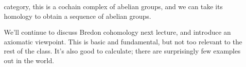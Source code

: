 category, this is a cochain complex of abelian groups, and we can take its homology to obtain a sequence of abelian
groups.

We'll continue to discuss Bredon cohomology next lecture, and introduce an axiomatic viewpoint. This is basic and
fundamental, but not too relevant to the rest of the class. It's also good to calculate; there are surprisingly few
examples out in the world.

